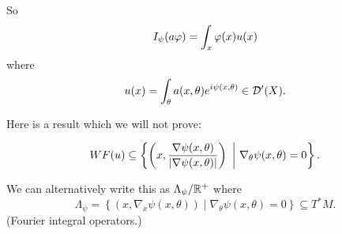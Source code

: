 So
\[ I_\psi(a\varphi) = \int_x \varphi(x)u(x) \]
where
\[ u(x) = \int_\theta a(x,\theta) e^{i\psi(x,\theta)} \in \mathcal{D}'(X). \]

Here is a result which we will not prove:
\begin{thm}
  \[ WF(u) \subseteq \left\{ \left( x,\frac{\nabla\psi(x,\theta)}{\abs{\nabla\psi(x,\theta)}} \right) \ \bigg\vert\ \nabla_\theta\psi(x,\theta)=0 \right\}. \]
\end{thm}

We can alternatively write this as $\Lambda_\psi/\mathbb{R}^+$ where
\[ \Lambda_\psi = \left\{ (x,\nabla_x\psi(x,\theta)) \mid \nabla_\theta\psi(x,\theta)=0 \right\} \subseteq T^*M. \]
(Fourier integral operators.)
